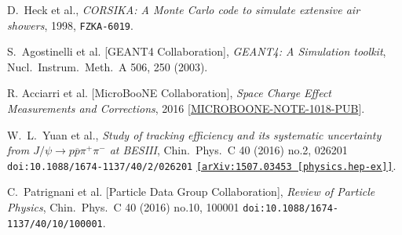 \documentclass[a4paper,11pt]{article}
\begin{document}
\begin{thebibliography}{99}
   D.~Heck et al.,
  \textit{CORSIKA: A Monte Carlo code to simulate extensive air showers}, 1998,
  \texttt{FZKA-6019}.

   S.~Agostinelli et al. [GEANT4 Collaboration], \textit{GEANT4: A Simulation toolkit}, Nucl.\ Instrum.\ Meth.\ A {506}, 250 (2003).

   R. Acciarri et al. [MicroBooNE Collaboration], \textit{Space Charge Effect Measurements and Corrections}, 2016 [\href{http://www-microboone.fnal.gov/publications/publicnotes/index.html}{MICROBOONE-NOTE-1018-PUB}].

   W.~L.~Yuan et al., \textit{Study of tracking efficiency and its systematic uncertainty from $J/\psi \to p \overline{p} \pi^+ \pi^-$ at BESIII}, Chin.\ Phys.\ C 40 (2016) no.2,  026201 \texttt{doi:10.1088/1674-1137/40/2/026201}  \texttt{\href{https://arxiv.org/abs/1506.05348}{[arXiv:1507.03453 [physics.hep-ex]]}}.

   C.~Patrignani et al. [Particle Data Group Collaboration], \textit{Review of Particle Physics}, Chin.\ Phys.\ C 40 (2016) no.10,  100001 \texttt{doi:10.1088/1674-1137/40/10/100001}.





\end{thebibliography}
\end{document}

